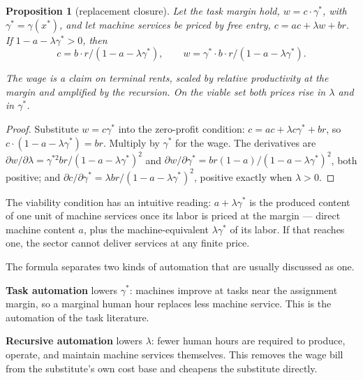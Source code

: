 \documentclass[12pt]{article}
\theoremstyle{plain}
\newtheorem{proposition}{Proposition}
\begin{document}
\begin{proposition}[replacement closure]\label{prop:replacement}
Let the task margin hold, $w = c\cdot \gamma ^*$, with $\gamma ^* = \gamma (x^*)$, and let machine services be priced by free entry, $c = ac + \lambda w + br$. If $1 - a - \lambda \gamma ^* > 0$, then
\begin{equation}\label{eq:closure}
c = b\cdot r / (1 - a - \lambda \gamma ^*),\qquad w = \gamma ^*\cdot b\cdot r / (1 - a - \lambda \gamma ^*).
\end{equation}

The wage is a claim on terminal rents, scaled by relative productivity at the margin and amplified by the recursion. On the viable set both prices rise in $\lambda$ and in $\gamma ^*$.
\end{proposition}

\begin{proof}
Substitute $w = c\gamma ^*$ into the zero-profit condition: $c = ac + \lambda c\gamma ^* + br$, so $c\cdot (1 - a - \lambda \gamma ^*) = br$. Multiply by $\gamma ^*$ for the wage. The derivatives are $\partial w/\partial \lambda = \gamma ^{*2}br/(1-a-\lambda \gamma ^*)^2$ and $\partial w/\partial \gamma ^* = br(1-a)/(1-a-\lambda \gamma ^*)^2$, both positive; and $\partial c/\partial \gamma ^* = \lambda br/(1-a-\lambda \gamma ^*)^2$, positive exactly when $\lambda > 0$.
\end{proof}

The viability condition has an intuitive reading: $a + \lambda \gamma ^*$ is the produced content of one unit of machine services once its labor is priced at the margin --- direct machine content $a$, plus the machine-equivalent $\lambda \gamma ^*$ of its labor. If that reaches one, the sector cannot deliver services at any finite price.

The formula separates two kinds of automation that are usually discussed as one.

\textbf{Task automation} lowers $\gamma ^*$: machines improve at tasks near the assignment margin, so a marginal human hour replaces less machine service. This is the automation of the task literature.

\textbf{Recursive automation} lowers $\lambda$: fewer human hours are required to produce, operate, and maintain machine services themselves. This removes the wage bill from the substitute's own cost base and cheapens the substitute directly.
\end{document}
